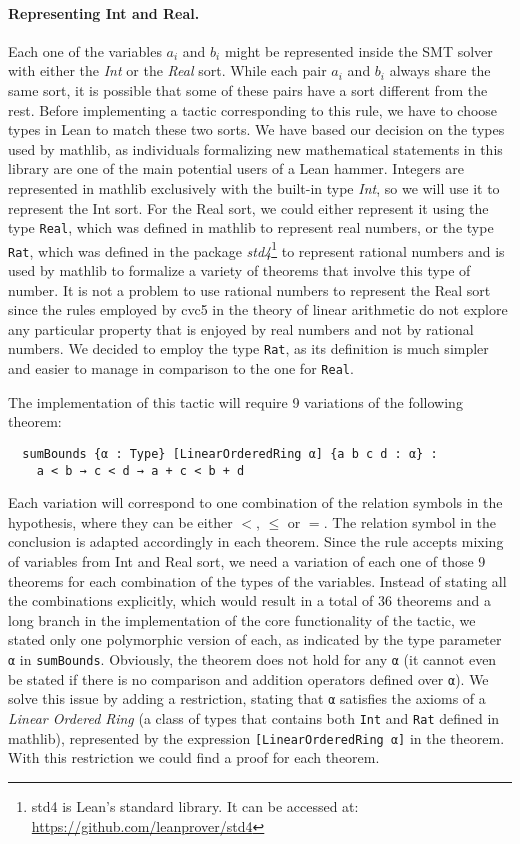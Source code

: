 \paragraph{Representing Int and Real.} Each one of the variables $a_{i}$ and $b_{i}$ might be represented inside the SMT solver
with either the \textit{Int} or the \textit{Real} sort. While each pair $a_{i}$ and $b_{i}$ always share the same sort, it is possible that some of these pairs have a sort different from the rest. Before implementing a
tactic corresponding to this rule, we have to choose types in Lean to match
these two sorts. We have based our decision on the types used by mathlib, as
individuals formalizing new mathematical statements in this library are one of the main potential users
of a Lean hammer. Integers are represented in mathlib exclusively with the built-in type \textit{Int}, so we will use it to represent the Int sort.
For the Real sort, we could either represent it using the type \texttt{Real}, which was defined in mathlib
to represent real numbers, or the type \texttt{Rat}, which was defined in the package \textit{std4}\footnote{std4 is Lean's standard library. It can be accessed at: \url{https://github.com/leanprover/std4}} to
represent rational numbers and is used by mathlib to formalize a variety of theorems
that involve this type of number.
It is not a problem to use rational numbers to represent the Real sort since the rules employed by cvc5 in the theory of linear arithmetic
do not explore any particular property that is enjoyed by real numbers and not by
rational numbers.
We decided to employ the type \texttt{Rat}, as its definition is much simpler and easier
to manage in comparison to the one for \texttt{Real}.

The implementation of this tactic will require 9 variations of the following theorem:

\begin{verbatim}
  sumBounds {α : Type} [LinearOrderedRing α] {a b c d : α} :
    a < b → c < d → a + c < b + d
\end{verbatim}

Each variation will correspond to one combination of the relation symbols in the hypothesis, where
they can be either $<$, $\le$ or $=$. The relation symbol in the
conclusion is adapted accordingly in each theorem. Since the rule accepts mixing of variables
from Int and Real sort, we need a variation of each one of those 9 theorems for each combination
of the types of the variables. Instead of stating all the combinations explicitly, which would
result in a total of 36 theorems and a long branch in the implementation of the core functionality of the tactic,
we stated only one polymorphic version of each, as indicated by the type parameter \texttt{α} in \texttt{sumBounds}.
Obviously, the theorem does not hold
for any \texttt{α} (it cannot even be stated if there is no comparison and addition operators defined over \texttt{α}).
We solve this issue by adding a restriction, stating that \texttt{α} satisfies the axioms of a
\textit{Linear Ordered Ring} (a class of types that contains both \texttt{Int} and \texttt{Rat} defined in mathlib), represented by the expression \texttt{[LinearOrderedRing α]} in the theorem. With this restriction we
could find a proof for each theorem.

